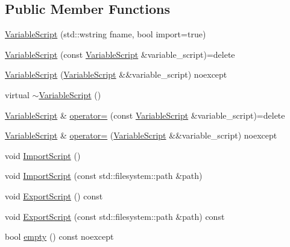 \subsection*{Public Member Functions}
\begin{DoxyCompactItemize}
\item 
\mbox{\hyperlink{classmage_1_1_variable_script_a996678899f4ffdaa94ad9a4dcd441d1c}{Variable\+Script}} (std\+::wstring fname, bool import=true)
\item 
\mbox{\hyperlink{classmage_1_1_variable_script_aebd4e6cf2bdae4e57c9da428007fc4d7}{Variable\+Script}} (const \mbox{\hyperlink{classmage_1_1_variable_script}{Variable\+Script}} \&variable\+\_\+script)=delete
\item 
\mbox{\hyperlink{classmage_1_1_variable_script_ac29cca638a32bccae00a9e53404158d5}{Variable\+Script}} (\mbox{\hyperlink{classmage_1_1_variable_script}{Variable\+Script}} \&\&variable\+\_\+script) noexcept
\item 
virtual \mbox{\hyperlink{classmage_1_1_variable_script_ae7026e1283b1a1164f02fdc3e1f2b829}{$\sim$\+Variable\+Script}} ()
\item 
\mbox{\hyperlink{classmage_1_1_variable_script}{Variable\+Script}} \& \mbox{\hyperlink{classmage_1_1_variable_script_ae090b066ea939fc6611e77a47df6a97f}{operator=}} (const \mbox{\hyperlink{classmage_1_1_variable_script}{Variable\+Script}} \&variable\+\_\+script)=delete
\item 
\mbox{\hyperlink{classmage_1_1_variable_script}{Variable\+Script}} \& \mbox{\hyperlink{classmage_1_1_variable_script_a7cb6a585a701268aaac38d8f039fc403}{operator=}} (\mbox{\hyperlink{classmage_1_1_variable_script}{Variable\+Script}} \&\&variable\+\_\+script) noexcept
\item 
void \mbox{\hyperlink{classmage_1_1_variable_script_a5f1cc3bfb611edbc8dfb433ec55cc965}{Import\+Script}} ()
\item 
void \mbox{\hyperlink{classmage_1_1_variable_script_aea1a4abf7c439897b9ac332896709c93}{Import\+Script}} (const std\+::filesystem\+::path \&path)
\item 
void \mbox{\hyperlink{classmage_1_1_variable_script_ab12b7f789f6af2b301ff350fa401b324}{Export\+Script}} () const
\item 
void \mbox{\hyperlink{classmage_1_1_variable_script_aba954f58218794227f026d8e5d286da9}{Export\+Script}} (const std\+::filesystem\+::path \&path) const
\item 
bool \mbox{\hyperlink{classmage_1_1_variable_script_a8a3f47783455cd6264dfc996887fd0f0}{empty}} () const noexcept

\end{DoxyCompactItemize}

